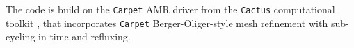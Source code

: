 The code is build on the \texttt{Carpet} \ac{AMR} driver \citep{Schnetter:2003rb} from the 
\texttt{Cactus} computational toolkit \citep{Goodale:2003}, that incorporates
\texttt{Carpet} Berger-Oliger-style mesh refinement \citep{Berger:1989,Berger:1984} 
with sub-cycling in time and refluxing. %


